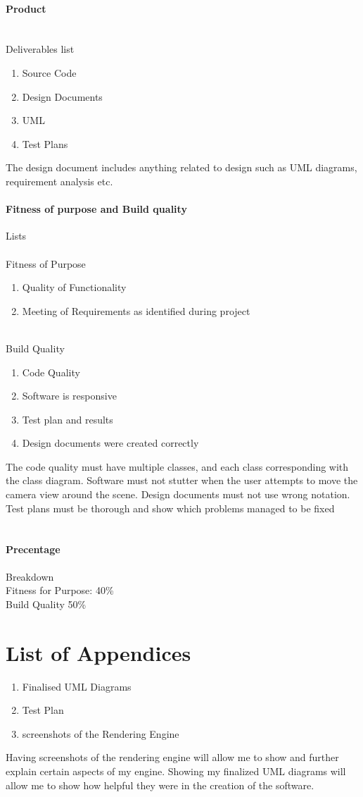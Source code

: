 \documentclass[]{article}
\begin{document}
\paragraph{Product}
\\
Deliverables list
\begin{enumerate}
    \item Source Code 
    \item Design Documents
    \item UML
    \item Test Plans
\end{enumerate}
The design document includes anything related to design such as UML diagrams, requirement analysis etc.

\paragraph{Fitness of purpose and Build quality} Lists
\\\\
Fitness of Purpose
\begin{enumerate}
  \item Quality of Functionality
  \item Meeting of Requirements as identified during project
\end{enumerate}
\\
Build Quality
\begin{enumerate}
  \item Code Quality
  \item Software is responsive
  \item Test plan and results
  \item Design documents were created correctly
\end{enumerate}
The code quality must have multiple classes, and each class corresponding with the class diagram. 
Software must not stutter when the user attempts to move the camera view around the scene.
Design documents must not use wrong notation.
Test plans must be thorough and show which problems managed to be fixed
\\\\
\paragraph{Precentage} Breakdown\\
Fitness for Purpose: 40\% \\ Build Quality 50\%

\section{List of Appendices}
\begin{enumerate}
    \item Finalised UML Diagrams
    \item Test Plan
    \item screenshots of the Rendering Engine
\end{enumerate}
Having screenshots of the rendering engine will allow me to show and further explain certain aspects of my engine.
Showing my finalized UML diagrams will allow me to show how helpful they were in the creation of the software.
\end{document}
